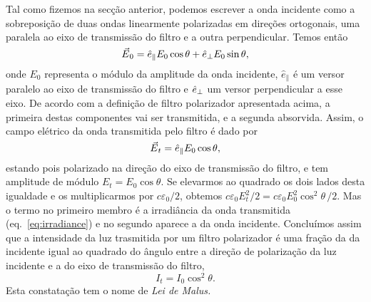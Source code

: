 Tal como fizemos na secção anterior, podemos escrever a onda incidente como a
sobreposição de duas ondas linearmente polarizadas em direções ortogonais, uma
paralela ao eixo de transmissão do filtro e a outra perpendicular. Temos então
\begin{equation*}
\vec E_0= \he_\parallel E_0\cos\theta+\he_\perp E_0\sin\theta,
\end{equation*}
onde $E_0$ representa o módulo da amplitude da onda incidente, $\hat
e_\parallel$ é um versor paralelo ao eixo de transmissão do filtro
e $\hat e_\perp$ um versor perpendicular a esse eixo. De acordo com a
definição de filtro polarizador apresentada acima, a primeira destas
componentes vai ser transmitida, e a segunda absorvida. Assim, o campo elétrico
da onda transmitida pelo filtro é dado por
\begin{equation}\label{eq:analized}
\vec E_t=\he_\parallel E_0\cos\theta,
\end{equation}
estando pois polarizado na direção do eixo de transmissão do filtro, e tem
amplitude de módulo $E_t=E_0\cos\theta$. Se elevarmos ao quadrado os
dois lados desta igualdade e os multiplicarmos por $c\varepsilon_0/2$, obtemos
$c\varepsilon_0 E^2_t/2=c\varepsilon_0 E^2_0\cos^2\theta\,/2$. Mas o
termo no primeiro membro é a irradiância da onda transmitida
(eq.~\eqref{eq:irradiance}) e no segundo aparece a da onda incidente. Concluímos
assim que a intensidade da luz trasmitida por um filtro polarizador é uma fração
da da incidente igual ao quadrado do ângulo entre a direção de polarização da
luz incidente e a do eixo de transmissão do filtro,
\begin{equation*}
I_t=I_0\cos^2\theta.
\end{equation*}
Esta constatação tem o nome de \emph{Lei de Malus.}

